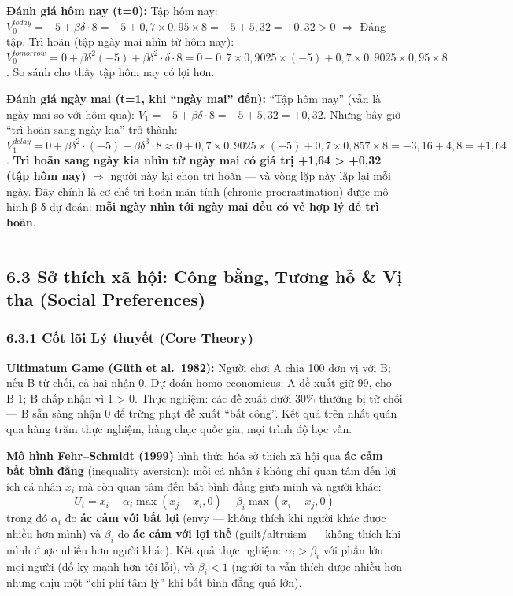\documentclass[
]{article}
\begin{document}
\textbf{Đánh giá hôm nay (t=0):} Tập hôm nay:
\(V_0^{today} = -5 + \beta\delta \cdot 8 = -5 + 0{,}7 \times 0{,}95 \times 8 = -5 + 5{,}32 = +0{,}32 > 0\)
\(\Rightarrow\) Đáng tập. Trì hoãn (tập ngày mai nhìn từ hôm nay):
\(V_0^{tomorrow} = 0 + \beta\delta^2(-5) + \beta\delta^2 \cdot \delta \cdot 8 = 0 + 0{,}7\times0{,}9025\times(-5) + 0{,}7\times0{,}9025\times0{,}95\times8\).
So sánh cho thấy tập hôm nay có lợi hơn.

\textbf{Đánh giá ngày mai (t=1, khi ``ngày mai'' đến):} ``Tập hôm nay''
(vẫn là ngày mai so với hôm qua):
\(V_1 = -5 + \beta\delta \cdot 8 = -5 + 5{,}32 = +0{,}32\). Nhưng bây
giờ ``trì hoãn sang ngày kia'' trở thành:
\(V_1^{delay} = 0 + \beta\delta^2 \cdot (-5) + \beta\delta^3 \cdot 8 \approx 0 + 0{,}7\times0{,}9025\times(-5) + 0{,}7\times0{,}857\times8 = -3{,}16 + 4{,}8 = +1{,}64\).
\textbf{Trì hoãn sang ngày kia nhìn từ ngày mai có giá trị +1,64
\textgreater{} +0,32 (tập hôm nay)} \(\Rightarrow\) người này lại chọn
trì hoãn --- và vòng lặp này lặp lại mỗi ngày. Đây chính là cơ chế trì
hoãn mãn tính (chronic procrastination) được mô hình β-δ dự đoán:
\textbf{mỗi ngày nhìn tới ngày mai đều có vẻ hợp lý để trì hoãn}.

\begin{center}\rule{0.5\linewidth}{0.5pt}\end{center}

\subsection{6.3 Sở thích xã hội: Công bằng, Tương hỗ \& Vị tha (Social
Preferences)}\label{sux1edf-thuxedch-xuxe3-hux1ed9i-cuxf4ng-bux1eb1ng-tux1b0ux1a1ng-hux1ed7-vux1ecb-tha-social-preferences}

\subsubsection{6.3.1 Cốt lõi Lý thuyết (Core
Theory)}\label{cux1ed1t-luxf5i-luxfd-thuyux1ebft-core-theory-10}

\textbf{Ultimatum Game (Güth et al.~1982):} Người chơi A chia 100 đơn vị
với B; nếu B từ chối, cả hai nhận 0. Dự đoán homo economicus: A đề xuất
giữ 99, cho B 1; B chấp nhận vì 1 \textgreater{} 0. Thực nghiệm: các đề
xuất dưới 30\% thường bị từ chối --- B sẵn sàng nhận 0 để trừng phạt đề
xuất ``bất công''. Kết quả trên nhất quán qua hàng trăm thực nghiệm,
hàng chục quốc gia, mọi trình độ học vấn.

\textbf{Mô hình Fehr--Schmidt (1999)} hình thức hóa sở thích xã hội qua
\textbf{ác cảm bất bình đẳng} (inequality aversion): mỗi cá nhân \(i\)
không chỉ quan tâm đến lợi ích cá nhân \(x_i\) mà còn quan tâm đến bất
bình đẳng giữa mình và người khác:
\[ U_i = x_i - \alpha_i \max(x_j - x_i, 0) - \beta_i \max(x_i - x_j, 0) \]
trong đó \(\alpha_i\) đo \textbf{ác cảm với bất lợi} (envy --- không
thích khi người khác được nhiều hơn mình) và \(\beta_i\) đo \textbf{ác
cảm với lợi thế} (guilt/altruism --- không thích khi mình được nhiều hơn
người khác). Kết quả thực nghiệm: \(\alpha_i > \beta_i\) với phần lớn
mọi người (đố kỵ mạnh hơn tội lỗi), và \(\beta_i < 1\) (người ta vẫn
thích được nhiều hơn nhưng chịu một ``chi phí tâm lý'' khi bất bình đẳng
quá lớn).
\end{document}
